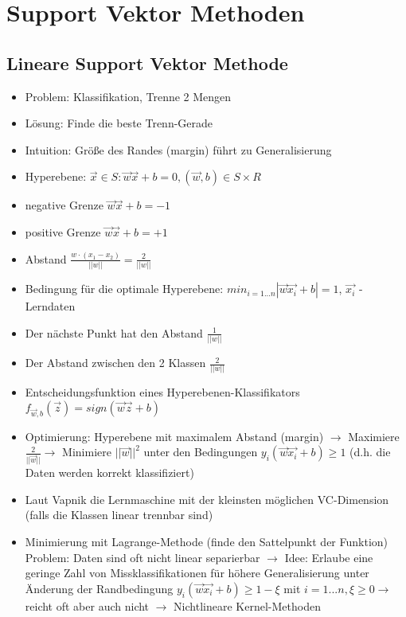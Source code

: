 \documentclass[paper=a4, fontsize=11pt]{scrartcl} %
\numberwithin{equation}{section} %
\numberwithin{figure}{section} %
\numberwithin{table}{section} %
\begin{document}
\section{Support Vektor Methoden}

\subsection{Lineare Support Vektor Methode}

\begin{itemize}
\item Problem: Klassifikation, Trenne 2 Mengen
\item Lösung: Finde die beste Trenn-Gerade
\item Intuition: Größe des Randes (margin) führt zu Generalisierung
\item Hyperebene: ${\vec{x} \in S: \vec{w} \vec{x} + b = 0, (\vec{w},b) \in S \times R}$
\item negative Grenze $\vec{w} \vec{x} + b = -1$
\item positive Grenze $\vec{w} \vec{x} + b = +1$
\item Abstand $\frac{w \cdot (x_1 - x_2)}{||w||} = \frac{2}{||w||}$
\item Bedingung für die optimale Hyperebene: $min_{i=1...n} |\vec{w} \vec{x_i} + b| = 1$, $\vec{x_i}$ - Lerndaten
\item Der nächste Punkt hat den Abstand $\frac{1}{||w||}$
\item Der Abstand zwischen den 2 Klassen $\frac{2}{||w||}$
\item Entscheidungsfunktion eines Hyperebenen-Klassifikators $f_{\vec{w},b}(\vec{z}) = sign(\vec{w}\vec{z} + b)$
\item Optimierung: Hyperebene mit maximalem Abstand (margin) $\rightarrow$ Maximiere $\frac{2}{||\vec{w}||} \rightarrow$ Minimiere $||\vec{w}||^2$ unter den Bedingungen $y_i(\vec{w}\vec{x_i} + b) \ge 1$ (d.h. die Daten werden korrekt klassifiziert)
\item Laut Vapnik die Lernmaschine mit der kleinsten möglichen VC-Dimension (falls die Klassen linear trennbar sind)
\item Minimierung mit Lagrange-Methode (finde den Sattelpunkt der Funktion)
Problem: Daten sind oft nicht linear separierbar $\rightarrow$ Idee: Erlaube eine geringe Zahl von Missklassifikationen für höhere Generalisierung unter Änderung der Randbedingung $y_i(\vec{w} \vec{x_i} + b) \ge 1 - \xi$ mit $i=1...n, \xi \ge 0 \rightarrow$ reicht oft aber auch nicht $\rightarrow$ Nichtlineare Kernel-Methoden
\end{itemize}
\end{document}
